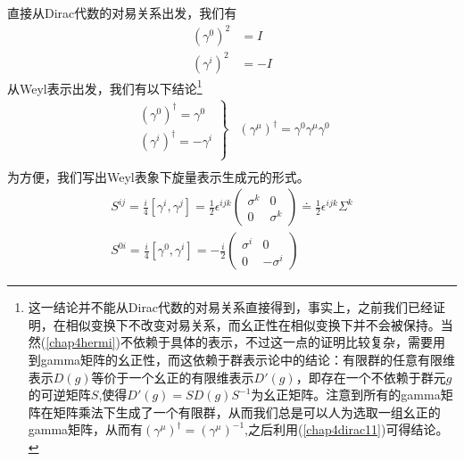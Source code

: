 直接从Dirac代数的对易关系出发，我们有
\begin{equation}
\label{chap4dirac11}
    \begin{aligned}
       (\gamma^{0})^{2}&=I\\
          (\gamma^{i})^{2}&=-I
       \end{aligned}
\end{equation}
从Weyl表示出发，我们有以下结论\footnote{这一结论并不能从Dirac代数的对易关系直接得到，事实上，之前我们已经证明，在相似变换下不改变对易关系，而幺正性在相似变换下并不会被保持。当然(\ref{chap4hermi})不依赖于具体的表示，不过这一点的证明比较复杂，需要用到gamma矩阵的幺正性，而这依赖于群表示论中的结论：有限群的任意有限维表示$D(g)$等价于一个幺正的有限维表示$D'(g)$，即存在一个不依赖于群元$g$的可逆矩阵$S$,使得$D'(g)=SD(g)S^{-1}$为幺正矩阵。注意到所有的gamma矩阵在矩阵乘法下生成了一个有限群，从而我们总是可以人为选取一组幺正的gamma矩阵，从而有$(\gamma^{\mu})^{\dagger}=(\gamma^{\mu})^{-1}$,之后利用(\ref{chap4dirac11})可得结论。}
\begin{equation}
\label{chap4hermi}
    \begin{aligned}
    \left.\begin{array}{cc}
         (\gamma^{0})^{\dagger}=\gamma^{0}\\
          (\gamma^{i})^{\dagger}=-\gamma^{i}\\
    \end{array}\right\}&(\gamma^{\mu})^{\dagger}=\gamma^{0}\gamma^{\mu}\gamma^{0}\\
       \end{aligned}
\end{equation}
为方便，我们写出Weyl表象下旋量表示生成元的形式。
\begin{equation}
    \begin{aligned}
    S^{ij}=\frac{i}{4}\left[\gamma^{i},\gamma^{j}\right]=\frac{1}{2}\epsilon^{ijk}\left(\begin{array}{cc}
      \sigma^{k}   &0  \\
       0  & \sigma^{k}
    \end{array}\right)\doteq \frac{1}{2}\epsilon^{ijk}\Sigma^{k}\\
    S^{0i}=\frac{i}{4}\left[\gamma^{0},\gamma^{i}\right]=-\frac{i}{2}\left(\begin{array}{cc}
      \sigma^{i}   &0  \\
       0  & -\sigma^{i}
    \end{array}\right)
    \end{aligned}
\end{equation}
